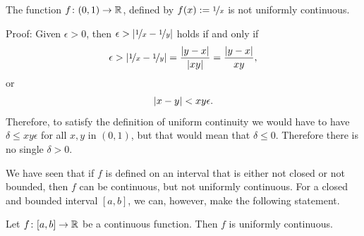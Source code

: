 \begin{example}
The function $f \colon (0,1) \to {\mathbb{R}}$, defined by $f(x) := \nicefrac{1}{x}$ is not
uniformly continuous.

Proof: Given $\epsilon > 0$, then $\epsilon >
\left\lvert {\nicefrac{1}{x}-\nicefrac{1}{y}} \right\rvert$ holds if and only if
\begin{equation*}
\epsilon >
\left\lvert {\nicefrac{1}{x}-\nicefrac{1}{y}} \right\rvert
=
\frac{\left\lvert {y-x} \right\rvert}{\left\lvert {xy} \right\rvert} 
=
\frac{\left\lvert {y-x} \right\rvert}{xy} ,
\end{equation*}
or
\begin{equation*}
\left\lvert {x-y} \right\rvert < xy \epsilon .
\end{equation*}
Therefore, to satisfy the definition of uniform continuity we would have to
have $\delta \leq xy \epsilon$ for all $x,y$ in $(0,1)$, but that would mean
that $\delta \leq 0$.  Therefore there is no single $\delta > 0$.
\end{example}

We have seen that if $f$ is defined on an interval that is either not closed
or not bounded, then $f$ can be continuous, but not uniformly continuous.
For a closed and bounded interval $[a,b]$, we can, however,
make the following statement.

\begin{thm} \label{unifcont:thm}
Let $f \colon [a,b] \to {\mathbb{R}}$ be a continuous function.  Then $f$
is uniformly continuous.
\end{thm}

